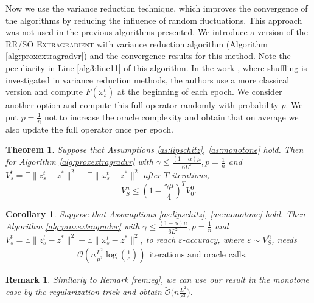 \documentclass{article}
\newtheorem{theorem}{Theorem}
\newtheorem{corollary}{Corollary}
\newtheorem{remark}{Remark}
\begin{document}
Now we use the variance reduction technique, which improves the convergence of the algorithms by reducing the influence of random fluctuations. This approach was not used in the previous algorithms presented. We introduce a version of the RR/SO \textsc{Extragradient} with variance reduction algorithm (Algorithm \ref{alg:proxextragradvr}) and the convergence results for this method. Note the peculiarity in Line \ref{alg3:line11} of this algorithm. In the work \citep{malinovsky2023random}, where shuffling is investigated in variance reduction methods, the authors use a more classical version and compute $F(\omega_s^t)$ at the beginning of each epoch. We consider another option and compute this full operator randomly with probability $p$. We put $p = \frac{1}{n}$ not to increase the oracle complexity and obtain that on average we also update the full operator once per epoch. 

\begin{theorem}\label{th:proxegvr}
    Suppose that Assumptions \ref{as:lipschitz}, \ref{as:monotone} hold. Then for Algorithm \ref{alg:proxextragradvr} with $\gamma \leqslant\frac{(1-\alpha)\mu}{6L^2}, p = \frac{1}{n}$ and $V_s^t =\mathbb E \|z_s^t - z^*\|^2 + \mathbb E\|\omega_s^t - z^*\|^2$ after $T$ iterations,
    \begin{equation*}
        V_S^n \leqslant \left(1 - \frac{\gamma\mu}{4}\right)^T V_0^0.
    \end{equation*}
\end{theorem}

\begin{corollary}\label{cor:proxegvr}
    Suppose that Assumptions \ref{as:lipschitz}, \ref{as:monotone} hold. Then Algorithm \ref{alg:proxextragradvr} with $\gamma \leqslant\frac{(1-\alpha)\mu}{6L^2}, p = \frac{1}{n}$ and $V_s^t =\mathbb E \|z_s^t - z^*\|^2 + \mathbb E\|\omega_s^t - z^*\|^2$, to reach $\varepsilon$-accuracy, where $\varepsilon \sim V_S^n$, needs
    \begin{align*}
    &\mathcal{O}\left(n\frac{L^2}{\mu^2}\log\left(\frac{1}{\varepsilon}\right)\right) ~~\text{iterations and oracle calls.}
    \end{align*}
\end{corollary}

\begin{remark}\label{rem:egvr}
    Similarly to Remark \ref{rem:eg}, we can use our result in the monotone case by the regularization trick and obtain $\mathcal{\widetilde{O}}\bigl(n\frac{L^2}{\varepsilon^2}\bigr)$.
\end{remark}
\end{document}
